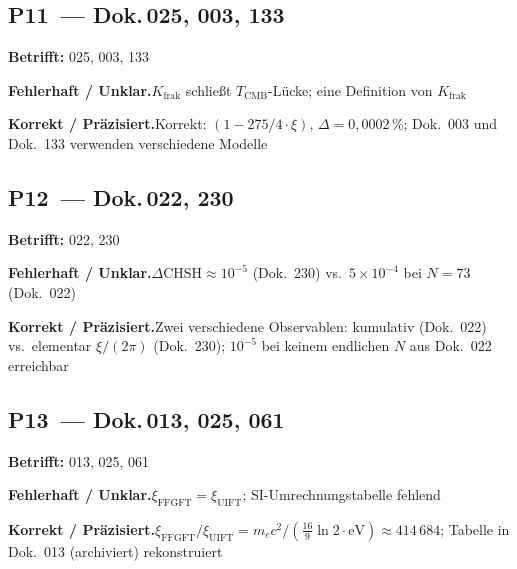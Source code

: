 \medskip


\subsection*{P11~--- Dok.\,025, 003, 133}

\noindent\textbf{Betrifft:} 025, 003, 133


\smallskip\noindent\textbf{Fehlerhaft / Unklar.}\quad $K_\text{frak}$ schließt $T_\text{CMB}$-Lücke; \newline
  eine Definition von $K_\text{frak}$


\smallskip\noindent\textbf{Korrekt / Präzisiert.}\quad Korrekt: $(1-275/4\cdot\xi)$, $\Delta=0{,}0002\,\%$; \newline
  Dok.~003 und Dok.~133 verwenden verschiedene Modelle


\medskip


\subsection*{P12~--- Dok.\,022, 230}

\noindent\textbf{Betrifft:} 022, 230


\smallskip\noindent\textbf{Fehlerhaft / Unklar.}\quad $\Delta\text{CHSH} \approx 10^{-5}$ (Dok.~230) vs.\
  $5\times10^{-4}$ bei $N=73$ (Dok.~022)


\smallskip\noindent\textbf{Korrekt / Präzisiert.}\quad Zwei verschiedene Observablen: kumulativ (Dok.~022) vs.\ elementar $\xi/(2\pi)$ (Dok.~230);
  $10^{-5}$ bei keinem endlichen $N$ aus Dok.~022 erreichbar


\medskip


\subsection*{P13~--- Dok.\,013, 025, 061}

\noindent\textbf{Betrifft:} 013, 025, 061


\smallskip\noindent\textbf{Fehlerhaft / Unklar.}\quad $\xi_\text{FFGFT} = \xi_\text{UIFT}$; \newline
  SI-Umrechnungstabelle fehlend


\smallskip\noindent\textbf{Korrekt / Präzisiert.}\quad $\xi_\text{FFGFT}/\xi_\text{UIFT} = m_ec^2/(\frac{16}{9}\ln 2\cdot\text{eV}) \approx 414\,684$; \newline
  Tabelle in Dok.~013 (archiviert) rekonstruiert


